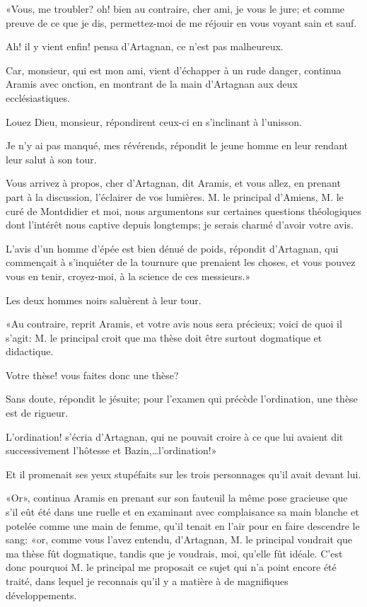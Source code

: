 «Vous, me troubler? oh! bien au contraire, cher ami, je vous le jure; et comme preuve de ce que je dis, permettez-moi de me réjouir en vous voyant sain et sauf. 

\speak  Ah! il y vient enfin! pensa d'Artagnan, ce n'est pas malheureux. 

\speak  Car, monsieur, qui est mon ami, vient d'échapper à un rude danger, continua Aramis avec onction, en montrant de la main d'Artagnan aux deux ecclésiastiques. 

\speak  Louez Dieu, monsieur, répondirent ceux-ci en s'inclinant à l'unisson. 

\speak  Je n'y ai pas manqué, mes révérends, répondit le jeune homme en leur rendant leur salut à son tour. 

\speak  Vous arrivez à propos, cher d'Artagnan, dit Aramis, et vous allez, en prenant part à la discussion, l'éclairer de vos lumières. M. le principal d'Amiens, M. le curé de Montdidier et moi, nous argumentons sur certaines questions théologiques dont l'intérêt nous captive depuis longtemps; je serais charmé d'avoir votre avis. 

\speak  L'avis d'un homme d'épée est bien dénué de poids, répondit d'Artagnan, qui commençait à s'inquiéter de la tournure que prenaient les choses, et vous pouvez vous en tenir, croyez-moi, à la science de ces messieurs.» 

Les deux hommes noirs saluèrent à leur tour. 

«Au contraire, reprit Aramis, et votre avis nous sera précieux; voici de quoi il s'agit: M. le principal croit que ma thèse doit être surtout dogmatique et didactique. 

\speak  Votre thèse! vous faites donc une thèse? 

\speak  Sans doute, répondit le jésuite; pour l'examen qui précède l'ordination, une thèse est de rigueur. 

\speak  L'ordination! s'écria d'Artagnan, qui ne pouvait croire à ce que lui avaient dit successivement l'hôtesse et Bazin,\dots l'ordination!» 

Et il promenait ses yeux stupéfaits sur les trois personnages qu'il avait devant lui. 

«Or», continua Aramis en prenant sur son fauteuil la même pose gracieuse que s'il eût été dans une ruelle et en examinant avec complaisance sa main blanche et potelée comme une main de femme, qu'il tenait en l'air pour en faire descendre le sang: «or, comme vous l'avez entendu, d'Artagnan, M. le principal voudrait que ma thèse fût dogmatique, tandis que je voudrais, moi, qu'elle fût idéale. C'est donc pourquoi M. le principal me proposait ce sujet qui n'a point encore été traité, dans lequel je reconnais qu'il y a matière à de magnifiques développements. 

